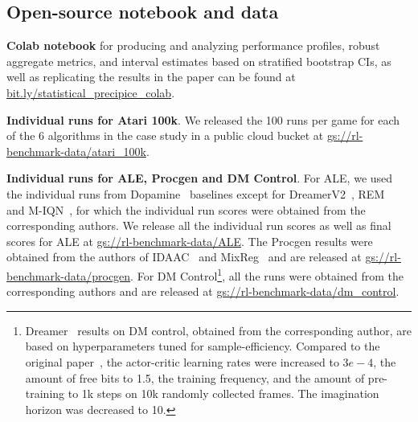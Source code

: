



\subsection{Open-source notebook and data}
\label{app:data_code}

\textbf{Colab notebook} for producing and analyzing performance profiles, robust aggregate metrics, and interval estimates based on stratified bootstrap CIs, as well as replicating the results in the paper can be found at \href{https://colab.research.google.com/drive/1ZmIhLVfxbj6ATIBg97RBJhFNs-6QWrik#scrollTo=CJzoQDw3zXtN}{\ttfamily bit.ly/statistical\_precipice\_colab}.

\textbf{Individual runs for Atari 100k}. We released the 100 runs per game for each of the 6 algorithms in the case study in a public cloud bucket at \href{https://console.cloud.google.com/storage/browser/rl-benchmark-data/atari_100k}{\ttfamily gs://rl-benchmark-data/atari\_100k}.

\textbf{Individual runs for ALE, Procgen and DM Control}. For ALE, we used the individual runs from Dopamine~\citep{castro2018dopamine} baselines except for DreamerV2~\citep{hafner2020mastering}, REM~\citep{agarwal2020optimistic} and M-IQN~\citep{vieillard2020munchausen}, for which the individual run scores were obtained from the corresponding authors. We release all the individual run scores as well as final scores for ALE at \href{https://console.cloud.google.com/storage/browser/rl-benchmark-data/ALE}{\ttfamily gs://rl-benchmark-data/ALE}. The Procgen results were obtained from the authors of IDAAC~\citep{raileanu2021decoupling} and MixReg~\citep{jiang2020prioritized} and are released at \href{https://console.cloud.google.com/storage/browser/rl-benchmark-data/procgen}{\ttfamily gs://rl-benchmark-data/procgen}. For DM Control\footnote{Dreamer~\citep{hafner2019dream} results on DM control, obtained from the corresponding author, are based on hyperparameters tuned for sample-efficiency. Compared to the original paper~\citep{hafner2019dream}, the actor-critic learning rates were increased to $3e-4$, the amount of free bits to 1.5, the training frequency, and the amount of pre-training to 1k steps on 10k randomly collected frames. The imagination horizon was decreased to 10.}, all the runs were obtained from the corresponding authors and are released at \href{https://console.cloud.google.com/storage/browser/rl-benchmark-data/dm_control}{\ttfamily  gs://rl-benchmark-data/dm\_control}. 

